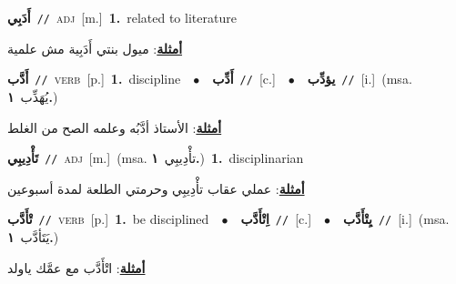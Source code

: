 \documentclass[10pt,a4paper,twoside]{article} %
\begin{document}
\begin{multicols}{2}
{\setlength\topsep{0pt}\textbf{\foreignlanguage{arabic}{أَدَبِي}}\ {\color{gray}\texttt{//}\color{black}}\ \textsc{adj}\ [m.]\ \textbf{1.}~related to literature\  \begin{flushright}\color{gray}\foreignlanguage{arabic}{\textbf{\underline{\foreignlanguage{arabic}{أمثلة}}}: ميول بنتي أَدَبِية مش علمية}\end{flushright}\color{black}} \vspace{2mm}

{\setlength\topsep{0pt}\textbf{\foreignlanguage{arabic}{أَدَّب}}\ {\color{gray}\texttt{//}\color{black}}\ \textsc{verb}\ [p.]\ \textbf{1.}~discipline\ \ $\bullet$\ \ \setlength\topsep{0pt}\textbf{\foreignlanguage{arabic}{أَدِّب}}\ {\color{gray}\texttt{//}\color{black}}\ [c.]\ \ $\bullet$\ \ \setlength\topsep{0pt}\textbf{\foreignlanguage{arabic}{يؤدِّب}}\ {\color{gray}\texttt{//}\color{black}}\ [i.]\ \color{gray}(msa. \foreignlanguage{arabic}{يُهَذِّب}~\foreignlanguage{arabic}{\textbf{١.}})\color{black}\  \begin{flushright}\color{gray}\foreignlanguage{arabic}{\textbf{\underline{\foreignlanguage{arabic}{أمثلة}}}: الأستاذ أدَّبُه وعلمه الصح من الغلط}\end{flushright}\color{black}} \vspace{2mm}

{\setlength\topsep{0pt}\textbf{\foreignlanguage{arabic}{تَأْدِيبِي}}\ {\color{gray}\texttt{//}\color{black}}\ \textsc{adj}\ [m.]\ \color{gray}(msa. \foreignlanguage{arabic}{تأْدِيبِي}~\foreignlanguage{arabic}{\textbf{١.}})\color{black}\ \textbf{1.}~disciplinarian\  \begin{flushright}\color{gray}\foreignlanguage{arabic}{\textbf{\underline{\foreignlanguage{arabic}{أمثلة}}}: عملي عقاب تأْدِيبِي وحرمتي الطلعة لمدة أسبوعين}\end{flushright}\color{black}} \vspace{2mm}

{\setlength\topsep{0pt}\textbf{\foreignlanguage{arabic}{تْأَدَّب}}\ {\color{gray}\texttt{//}\color{black}}\ \textsc{verb}\ [p.]\ \textbf{1.}~be disciplined\ \ $\bullet$\ \ \setlength\topsep{0pt}\textbf{\foreignlanguage{arabic}{اِتْأَدَّب}}\ {\color{gray}\texttt{//}\color{black}}\ [c.]\ \ $\bullet$\ \ \setlength\topsep{0pt}\textbf{\foreignlanguage{arabic}{يِتْأَدَّب}}\ {\color{gray}\texttt{//}\color{black}}\ [i.]\ \color{gray}(msa. \foreignlanguage{arabic}{يَتَأدَّب}~\foreignlanguage{arabic}{\textbf{١.}})\color{black}\  \begin{flushright}\color{gray}\foreignlanguage{arabic}{\textbf{\underline{\foreignlanguage{arabic}{أمثلة}}}: اتْأَدَّب مع عمَّك ياولد}\end{flushright}\color{black}} \vspace{2mm}


\end{multicols}
\end{document}
